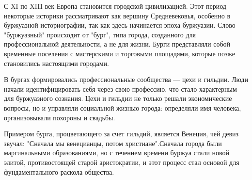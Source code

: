
С XI по XIII век Европа становится городской цивилизацией. Этот период некоторые историки рассматривают как вершину Средневековья, особенно в буржуазной историографии, так как здесь начинается эпоха буржуазии. Слово "буржуазный" происходит от "бург", типа города, созданного для профессиональной деятельности, а не для жизни. Бурги представляли собой временные поселения с мастерскими и торговыми площадями, которые позже становились настоящими городами.

В бургах формировались профессиональные сообщества — цехи и гильдии. Люди начали идентифицировать себя через свою профессию, что стало характерным для буржуазного сознания. Цехи и гильдии не только решали экономические вопросы, но и управляли социальной жизнью города: определяли имя человека, организовывали похороны и свадьбы.

Примером бурга, процветающего за счет гильдий, является Венеция, чей девиз звучал: "Сначала мы венецианцы, потом христиане".Сначала города были маргинальными образованиями, но с течением времени буржуа стали новой элитой, противостоящей старой аристократии, и этот процесс стал основой для фундаментального раскола общества.


